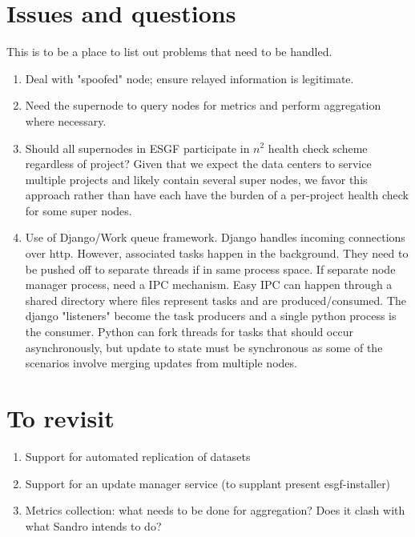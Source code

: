\documentclass[oneside,12pt]{memoir}
\begin{document}
\section{Issues and questions}
This is to be a place to list out problems that need to be handled.
\begin{enumerate}


\item
Deal with "spoofed" node; ensure relayed information is legitimate. 
\item
Need the supernode to query nodes for metrics and perform aggregation where necessary.
\item
Should all supernodes in ESGF participate in $n^2$ health check scheme regardless of project? Given that we expect the data centers to service multiple projects and likely contain several super nodes, we favor this approach rather than have each have the burden of a per-project health check for some super nodes.
\item  Use of Django/Work queue framework.  Django handles incoming connections over http.  However, associated tasks happen in the background.  They need to be pushed off to separate threads if in same process space.  If separate node manager process, need a IPC mechanism.  Easy IPC can happen through a shared directory where files represent tasks and are produced/consumed.  The django "listeners" become the task producers and a single python process is the consumer.   Python can fork threads for tasks that should occur asynchronously, but update to state must be synchronous as some of the scenarios involve merging updates from multiple nodes.



\end{enumerate}

\section{To revisit}
\begin{enumerate}
\item Support for automated replication of datasets
\item Support for an update manager service (to supplant present esgf-installer)
\item Metrics collection: what needs to be done for aggregation? Does it clash with what Sandro intends to do?
\end{enumerate}
\end{document}
